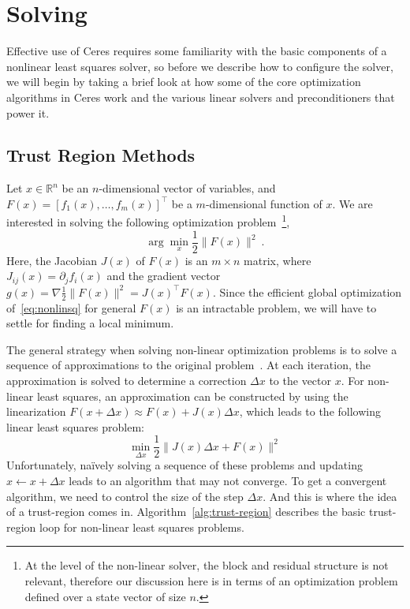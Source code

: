 \chapter{Solving}
Effective use of Ceres requires some familiarity with the basic components of a nonlinear least squares solver, so before we describe how to configure the solver, we will begin by taking a brief look at how some of the core optimization algorithms in Ceres work and the various linear solvers and preconditioners that power it.

\section{Trust Region Methods}
Let $x \in \mathbb{R}^{n}$ be an $n$-dimensional vector of variables, and
$ F(x) = \left[f_1(x),   \hdots,  f_{m}(x) \right]^{\top}$ be a $m$-dimensional function of $x$.  We are interested in solving the following optimization problem~\footnote{At the level of the non-linear solver, the block and residual structure is not relevant, therefore our discussion here is in terms of an optimization problem defined over a state vector of size $n$.},
\begin{equation}
        \arg \min_x \frac{1}{2}\|F(x)\|^2\ .
        \label{eq:nonlinsq}
\end{equation}
Here, the Jacobian $J(x)$ of $F(x)$ is an $m\times n$ matrix, where $J_{ij}(x) = \partial_j f_i(x)$  and the gradient vector $g(x) = \nabla  \frac{1}{2}\|F(x)\|^2 = J(x)^\top F(x)$. Since the efficient global optimization of~\eqref{eq:nonlinsq} for general $F(x)$ is an intractable problem, we will have to settle for finding a local minimum.

The general strategy when solving non-linear optimization problems is to solve a sequence of approximations to the original problem~\cite{nocedal2000numerical}. At each iteration, the approximation is solved to determine a correction $\Delta x$ to the vector $x$. For non-linear least squares, an approximation can be constructed by using the linearization $F(x+\Delta x) \approx F(x) + J(x)\Delta x$, which leads to the following linear least squares  problem:
\begin{equation}
         \min_{\Delta x} \frac{1}{2}\|J(x)\Delta x + F(x)\|^2
        \label{eq:linearapprox}
\end{equation}
Unfortunately, na\"ively solving a sequence of these problems and
updating $x \leftarrow x+ \Delta x$ leads to an algorithm that may not
converge.  To get a convergent algorithm, we need to control the size
of the step $\Delta x$. And this is where the idea of a trust-region
comes in. Algorithm~\ref{alg:trust-region} describes the basic  trust-region loop for non-linear least squares problems.

